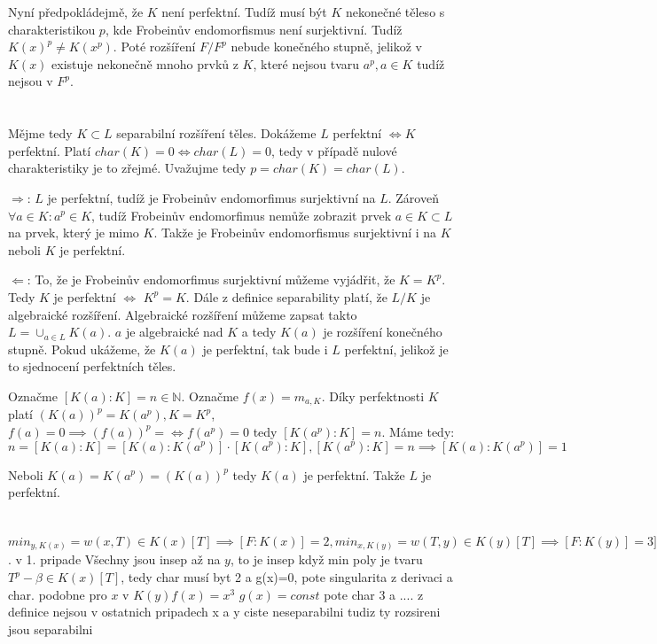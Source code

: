 \documentclass[12pt, a4paper]{article}
\begin{document}
Nyní předpokládejmě, že $K$ není perfektní. Tudíž musí být $K$ nekonečné těleso s charakteristikou $p$, kde Frobeinův endomorfismus není surjektivní. Tudíž $K(x)^p \neq K(x^p)$. Poté rozšíření $F/F^p$ nebude konečného stupně, jelikož v $K(x)$ existuje nekonečně mnoho prvků z $K$, které nejsou tvaru $a^p, a \in K$ tudíž nejsou v $F^p$.

\section{}
Mějme tedy $K \subset L$ separabilní rozšíření těles. Dokážeme $L$ perfektní $\iff K$ perfektní. Platí $char(K) = 0 \iff char(L) = 0$, tedy v případě nulové charakteristiky je to zřejmé. Uvažujme tedy $p = char(K) = char(L)$.

$\Rightarrow$: $L$ je perfektní, tudíž je Frobeinův endomorfimus surjektivní na $L$. Zároveň $\forall a \in K: a^p \in K$, tudíž Frobeinův endomorfimus nemůže zobrazit prvek $a \in K \subset L$ na prvek, který je mimo $K$. Takže je Frobeinův endomorfismus surjektivní i na $K$ neboli $K$ je perfektní.

$\Leftarrow$: To, že je Frobeinův endomorfimus surjektivní můžeme vyjádřit, že $K = K^p$. Tedy $K$ je perfektní $\iff$ $K^p = K$. Dále z definice separability platí, že $L/K$ je algebraické rozšíření. Algebraické rozšíření můžeme zapsat takto $L = \cup_{a\in L} K(a)$. $a$ je algebraické nad $K$ a tedy $K(a)$ je rozšíření konečného stupně. Pokud ukážeme, že $K(a)$ je perfektní, tak bude i $L$ perfektní, jelikož je to sjednocení perfektních těles.

Označme $[K(a):K]=n \in \mathbb{N}$. Označme $f(x)=m_{a,K}$. Díky perfektnosti $K$ platí $(K(a))^p = K(a^p), K = K^p$, $f(a)=0 \implies (f(a))^p = \iff f(a^p)=0$ tedy $[K(a^p):K] = n$. Máme tedy:
\[
n=[K(a):K]=[K(a):K(a^p)]\cdot [K(a^p):K], [K(a^p):K] =n \implies [K(a):K(a^p)] = 1
\]

Neboli $K(a)=K(a^p)=(K(a))^p$ tedy $K(a)$ je perfektní. Takže $L$ je perfektní.

\section{}
$min_{y,K(x)} = w(x,T) \in K(x)[T] \implies [F:K(x)] = 2, min_{x,K(y)} = w(T,y) \in K(y)[T] \implies [F:K(y)] = 3]$. v 1. pripade Všechny jsou insep až na $y$, to je insep když min poly je tvaru $T^p - \beta \in K(x)[T]$, tedy char musí byt 2 a g(x)=0, pote singularita z derivaci a char. podobne pro $x$ v $K(y) f(x) = x^3$ $ g(x)=const$ pote char 3 a .... z definice nejsou v ostatnich pripadech x a y ciste neseparabilni tudiz ty rozsireni jsou separabilni
\end{document}

